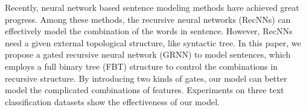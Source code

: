 Recently, neural network based sentence modeling methods have achieved great progress. Among these methods, the recursive neural networks (RecNNs) can effectively model the combination of the words in sentence. However, RecNNs need a given external topological structure, like syntactic tree. In this paper, we propose a gated recursive neural network (GRNN) to model sentences, which employs a full binary tree (FBT) structure to control the combinations in recursive structure. By introducing two kinds of gates, our model can better model the complicated combinations of features. Experiments on three text classification datasets show the effectiveness of our model.
